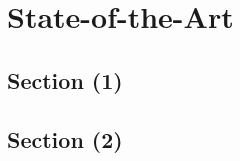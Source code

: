 \chapter{State-of-the-Art}
\lipsum[1-2] 

\section{Section (1)}
\lipsum[2-5] \cite{book2011ahad_1} \cite{oneata2013action_13}


\section{Section (2)}
\lipsum[2-5] \cite{usha2014motion}